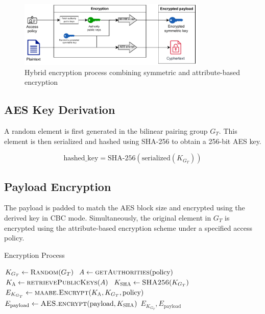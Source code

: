 \documentclass[cic,tc,english]{iiufrgs}
\begin{document}
        \begin{figure}
            \centering
            \includegraphics[width=0.8\textwidth]{images/diagrams/encryption_diagram}
            \caption{Hybrid encryption process combining symmetric and attribute-based encryption}
            \label{fig:encryption_diagram}
        \end{figure}


        \subsection{AES Key Derivation}

            A random element is first generated in the bilinear pairing group $G_T$. This element is then serialized and hashed using SHA-256 to obtain a 256-bit AES key.

            \begin{equation}
            \text{hashed\_key} = \text{SHA-256}(\text{serialized}(K_{G_T}))
            \end{equation}

        \subsection{Payload Encryption}

            The payload is padded to match the AES block size and encrypted using the derived key in CBC mode. Simultaneously, the original element in $G_T$ is encrypted using the attribute-based encryption scheme under a specified access policy.

            \begin{algorithm}
                \caption{Encryption Process}
                \label{alg:encryption_process}
                \scriptsize
                \begin{algorithmic}[1]
                    \State $K_{G_T} \gets \textsc{Random}(G_T)$
                    \State $A \gets \textsc{getAuthorities}(\text{policy})$
                    \State $K_{\textsc{A}} \gets \textsc{retrievePublicKeys}(A)$
                    \State $K_{\textsc{SHA}} \gets \textsc{SHA256}(K_{G_T})$
                    \State $E_{K_{G_T}} \gets \textsc{maabe.Encrypt}(K_{\textsc{A}}, K_{G_T}, \text{policy})$
                    \State $E_{\text{payload}} \gets \textsc{AES.encrypt}(\text{payload}, K_{\textsc{SHA}})$
                    \State \Return $E_{K_{G_T}}, E_{\text{payload}}$
                \EndProcedure
                \end{algorithmic}
            \end{algorithm}
\end{document}
